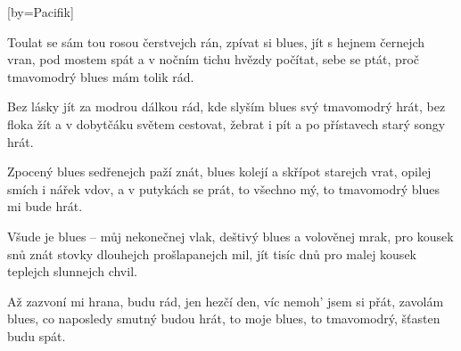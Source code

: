 [by={Pacifik}]

\beginverse{}
Toulat se sám tou rosou čerstvejch rán,
zpívat si blues, jít s hejnem černejch vran,
pod mostem spát a v nočním tichu hvězdy počítat,
sebe se ptát, proč tmavomodrý blues mám tolik rád.
\endverse{}

\beginverse{}
\chordsoff{}
Bez lásky jít za modrou dálkou rád,
kde slyším blues svý tmavomodrý hrát,
bez floka žít a v dobytčáku světem cestovat,
žebrat i pít a po přístavech starý songy hrát.
\chordson{}
\endverse{}

\beginverse{}
\chordsoff{}
Zpocený blues sedřenejch paží znát,
blues kolejí a skřípot starejch vrat,
opilej smích i nářek vdov, a v putykách se prát,
to všechno mý, to tmavomodrý blues mi bude hrát.
\chordson{}
\endverse{}

\beginverse{}
\chordsoff{}
Všude je blues -- můj nekonečnej vlak,
deštivý blues a volověnej mrak,
pro kousek snů znát stovky dlouhejch prošlapanejch mil,
jít tisíc dnů pro malej kousek teplejch slunnejch chvil.
\chordson{}
\endverse{}

\beginverse{}
\chordsoff{}
Až zazvoní mi hrana, budu rád,
jen hezčí den, víc nemoh' jsem si přát,
zavolám blues, co naposledy smutný budou hrát,
to moje blues, to tmavomodrý, šťasten budu spát.
\chordson{}
\endverse{}

\endsong{}
